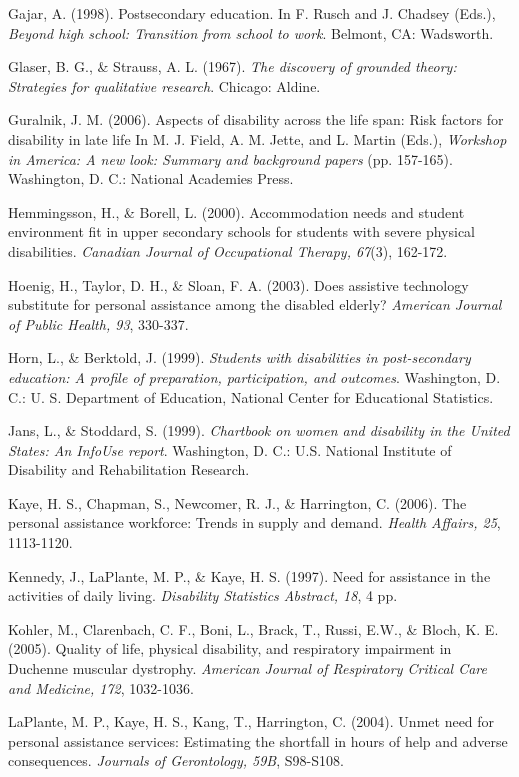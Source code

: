 \documentclass[11.5pt]{sig-alternate} %
\begin{document}
Gajar, A. (1998). Postsecondary education. In F. Rusch and J. Chadsey (Eds.), \textit{Beyond high school: Transition from school to work}. Belmont, CA: Wadsworth.

Glaser, B. G., \& Strauss, A. L. (1967). \textit{The discovery of grounded theory: Strategies for qualitative research}. Chicago: Aldine.

Guralnik, J. M. (2006). Aspects of disability across the life span: Risk factors for disability in late life In M. J. Field, A. M. Jette, and L. Martin (Eds.), \textit{Workshop in America: A new look: Summary and background papers} (pp. 157-165). Washington, D. C.: National Academies Press.

Hemmingsson, H., \& Borell, L. (2000). Accommodation needs and student environment fit in upper secondary schools for students with severe physical disabilities. \textit{Canadian Journal of Occupational Therapy, 67}(3), 162-172.

Hoenig, H., Taylor, D. H., \& Sloan, F. A. (2003). Does assistive technology substitute for personal assistance among the disabled elderly? \textit{American Journal of Public Health, 93}, 330-337.

Horn, L., \& Berktold, J. (1999). \textit{Students with disabilities in post-secondary education: A profile of preparation, participation, and outcomes}. Washington, D. C.: U. S. Department of Education, National Center for Educational Statistics.

Jans, L., \& Stoddard, S. (1999). \textit{Chartbook on women and disability in the United States: An InfoUse report}. Washington, D. C.: U.S. National Institute of Disability and Rehabilitation Research.

Kaye, H. S., Chapman, S., Newcomer, R. J., \& Harrington, C. (2006). The personal assistance workforce: Trends in supply and demand. \textit{Health Affairs, 25}, 1113-1120.

Kennedy, J., LaPlante, M. P., \& Kaye, H. S. (1997). Need for assistance in the activities of daily living. \textit{Disability Statistics Abstract, 18}, 4 pp.

Kohler, M., Clarenbach, C. F., Boni, L., Brack, T., Russi, E.W., \& Bloch, K. E. (2005). Quality of life, physical disability, and respiratory impairment in Duchenne muscular dystrophy. \textit{American Journal of Respiratory Critical Care and Medicine, 172}, 1032-1036.

LaPlante, M. P., Kaye, H. S., Kang, T., Harrington, C. (2004). Unmet need for personal assistance services: Estimating the shortfall in hours of help and adverse consequences. \textit{Journals of Gerontology, 59B}, S98-S108.
\end{document}
